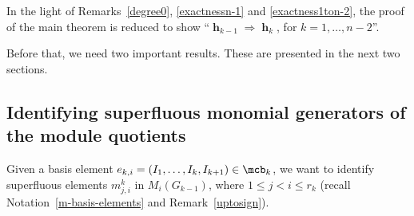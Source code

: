 \begin{purpose}\label{reduction}
In the light of Remarks~\ref{degree0}, \ref{exactnessn-1} and
\ref{exactness1ton-2}, the proof of the main theorem is reduced to
show ``$\mbfh_{k-1}\Rightarrow \mbfh_{k}$, for $k=1,\ldots ,n-2$''.
\end{purpose}

Before that, we need two important results. These are presented in the next
two sections.

\subsection{Identifying superfluous monomial generators of the 
module quotients}

 Given a basis element $e_{k,i}=(I_1,\ldots
,I_k,I_{k+1})\in\mcb_k$, we want to identify superfluous elements
$m^k_{j,i}$ in $M_{i}(G_{k-1})$, where $1\leq j<i\leq r_k$ (recall
Notation~\ref{m-basis-elements} and Remark~\ref{uptosign}).

